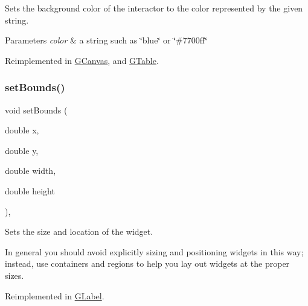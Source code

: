 Sets the background color of the interactor to the color represented by the given string. 


\begin{DoxyParams}{Parameters}
{\em color} & a string such as \char`\"{}blue\char`\"{} or \char`\"{}\#7700ff\char`\"{} \\
\hline
\end{DoxyParams}


Reimplemented in \mbox{\hyperlink{classsgl_1_1GCanvas_a9cb99695b93494c7ba28268ce9e42c2a}{G\+Canvas}}, and \mbox{\hyperlink{classsgl_1_1GTable_a9cb99695b93494c7ba28268ce9e42c2a}{G\+Table}}.

\mbox{\label{classsgl_1_1GInteractor_a2aae8197624b72265ab83b4f1bc73f2f}} 
\subsubsection{\texorpdfstring{set\+Bounds()}{setBounds()}\hspace{0.1cm}{\footnotesize\ttfamily [1/2]}}
{\footnotesize\ttfamily void set\+Bounds (\begin{DoxyParamCaption}\item[{double}]{x,  }\item[{double}]{y,  }\item[{double}]{width,  }\item[{double}]{height }\end{DoxyParamCaption})\hspace{0.3cm}{\ttfamily [virtual]}, {\ttfamily [inherited]}}



Sets the size and location of the widget. 

In general you should avoid explicitly sizing and positioning widgets in this way; instead, use containers and regions to help you lay out widgets at the proper sizes. 

Reimplemented in \mbox{\hyperlink{classsgl_1_1GLabel_ab9f89f193ad29d66c547cfee29ffde39}{G\+Label}}.

\mbox{\label{classsgl_1_1GInteractor_acada386653f008cacc7cce86426bef7c}} 
